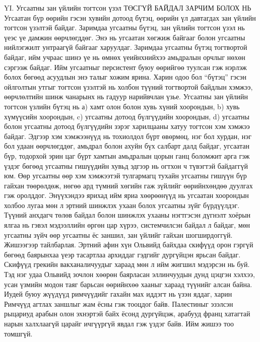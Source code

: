 YI. Угсаатны зан үйлийн тогтсон үзэл
ТӨСГҮЙ БАЙДАЛ ЗАРЧИМ БОЛОХ НЬ
Угсаатан бүр өөрийн гэсэн хувийн дотоод бүтэц, өөрийн үл давтагдах зан үйлийн тогтсон үзэлтэй байдаг. Заримдаа угсаатны бүтэц, зан үйлийн тогтсон үзэл нь үеэс үе дамжин өөрчлөгддөг. Энэ нь угсаатан хөгжиж байгааг болон угсаатны нийлэгжилт унтраагүй байгааг харуулдаг. Заримдаа угсаатны бүтэц тогтвортой байдаг, ийм учраас шинэ үе нь өмнөх үеийнхнийхээ амьдралын орчлыг нөхөн сэргээж байдаг. Ийм угсаатныг персистент буюу өөрийгөө туулсан гэж нэрлэж болох бөгөөд асуудлын энэ талыг хожим ярина. Харин одоо бол “бүтэц” гэсэн ойлголтын утгыг тогтсон үзэлтэй нь холбон түүний тогтвортой байдлын хэмжээ, өөрчлөлтийн шинж чанарынх нь гадуур нарийвчлан үзье.
Угсаатны зан үйлийн тогтсон үзлийн бүтэц нь а) хамт олон болон хувь хүний хоорондын, b) хувь хүмүүсийн хоорондын, c) угсаатны дотоод бүлгүүдийн хоорондын, d) угсаатны болон угсаатны дотоод бүлгүүдийн зэрэг харилцааны хатуу тогтсон хэм хэмжээ байдаг. Эдгээр хэм хэмжээнүүд нь тохиолдол бүрт өвөрмөц, нэг бол хурдан, нэг бол удаан өөрчлөгддөг, амьдрал болон ахуйн бүх салбарт далд байдаг, угсаатан бүр, тодорхой эрин цаг бүрт хамтын амьдралын цорын ганц боломжит арга гэж үздэг бөгөөд угсаатны гишүүдийн хувьд эдгээр нь огтхон ч түвэгтэй байдаггүй юм. Өөр угсаатны өөр хэм хэмжээтэй тулгармагц тухайн угсаатны гишүүн бүр гайхан төөрөлдөж, нөгөө ард түмний хөгийн гаж зүйлийг өөрийнхөндөө дуулгах гэж оролддог. Энүүхэндээ ярихад ийм яриа хөөрөөнүүд нь угсаатан хоорондын холбоо лугаа мөн л эртний шинжлэх ухаан болох угсаатны зүйг бүрдүүлдэг. Түүний анхдагч төлөв байдал болон шинжлэх ухааны нэгтгэсэн дүгнэлт хоёрын ялгаа нь гэвэл мэдээллийн өргөн цар хүрээ, системчилсэн байдал л байдаг, мөн угсаатны зүйч өөр угсаатны ёс заншил, зан үйлийг гайхан шогширдоггүй.
Жишээгээр тайлбарлая. Эртний афин хүн Ольвийд байхдаа скифүүд орон гэргүй бөгөөд баярынхаа үеэр тасартлаа архиддаг гэдгийг дургүйцэн ярьсан байдаг. Скифүүд грекийн вакханаличуудыг хараад мөн л ийм жигшил мэдэрсэн нь буй. Тэд нэг удаа Ольвийд зочлон хөөрөн баярласан эллинчуудын дунд цэцгэн хэлхээ, усан үзмийн модон таяг барьсан өөрийнхөө хааныг хараад түүнийг алсан байна. Иудей буюу жүүдүүд римчүүдийг гахайн мах иддэгт нь үзэн яддаг, харин Римчүүд агтлах заншлыг жам ёсны гэж тооцдог байв. Палестиныг эзэлсэн рыцариуд арабын олон эхнэртэй байх ёсонд дургүйцэж, арабууд франц хатагтай нарын халхлаагүй царайг ичгүүргүй явдал гэж үздэг байв. Ийм жишээ тоо томшгүй.
